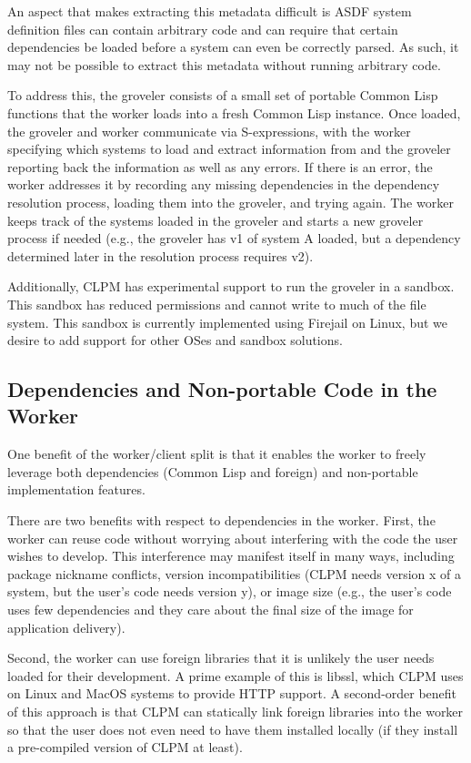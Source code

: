 \documentclass[format=sigconf]{acmart}
\begin{document}
An aspect that makes extracting this metadata difficult is ASDF system
definition files can contain arbitrary code and can require that certain
dependencies be loaded before a system can even be correctly parsed. As such,
it may not be possible to extract this metadata without running arbitrary code.

To address this, the groveler consists of a small set of portable Common Lisp
functions that the worker loads into a fresh Common Lisp instance. Once loaded,
the groveler and worker communicate via S-expressions, with the worker
specifying which systems to load and extract information from and the groveler
reporting back the information as well as any errors. If there is an error, the
worker addresses it by recording any missing dependencies in the dependency
resolution process, loading them into the groveler, and trying again. The
worker keeps track of the systems loaded in the groveler and starts a new
groveler process if needed (e.g., the groveler has v1 of system A loaded, but a
dependency determined later in the resolution process requires v2).

Additionally, CLPM has experimental support to run the groveler in a
sandbox. This sandbox has reduced permissions and cannot write to much of the
file system. This sandbox is currently implemented using Firejail
\cite{firejail} on Linux, but we desire to add support for other OSes and
sandbox solutions.

\subsection{Dependencies and Non-portable Code in the Worker}\label{sec:worker-non-portable-code}

One benefit of the worker/client split is that it enables the worker to freely
leverage both dependencies (Common Lisp and foreign) and non-portable
implementation features.

There are two benefits with respect to dependencies in the worker. First, the
worker can reuse code without worrying about interfering with the code the user
wishes to develop. This interference may manifest itself in many ways,
including package nickname conflicts, version incompatibilities (CLPM needs
version x of a system, but the user's code needs version y), or image size
(e.g., the user's code uses few dependencies and they care about the final size
of the image for application delivery).

Second, the worker can use foreign libraries that it is unlikely the user needs
loaded for their development. A prime example of this is libssl, which CLPM
uses on Linux and MacOS systems to provide HTTP support. A second-order benefit
of this approach is that CLPM can statically link foreign libraries into the
worker so that the user does not even need to have them installed locally (if
they install a pre-compiled version of CLPM at least).
\end{document}
